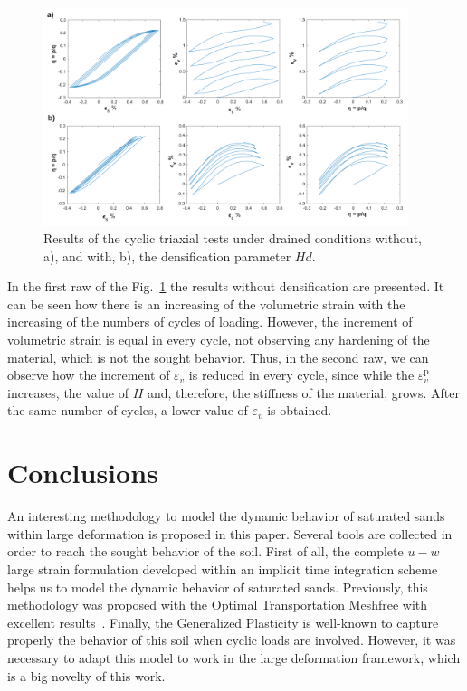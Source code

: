 \documentclass[preprint,12pt,a4paper]{elsarticle}
\begin{document}
\begin{figure}
\centering
\includegraphics[width=0.95\textwidth]{Figs/ciclo_drained.pdf}
\caption{Results of the cyclic triaxial tests under drained conditions without, a), and with, b), the densification parameter $Hd$.}
\label{fig_c_drained}
\end{figure}

In the first raw of the Fig.~\ref{fig_c_drained} the results without densification are presented. It can be seen how there is an increasing of the volumetric strain with the increasing of the numbers of cycles of loading. However, the increment of volumetric strain is equal in every cycle, not observing any hardening of the material, which is not the sought behavior. Thus, in the second raw, we can observe how the increment of $\varepsilon_{v}$ is reduced in every cycle, since while the $\varepsilon_{v}^{\mathrm{p}}$ increases, the value of $H$ and, therefore, the stiffness of the material, grows. After the same number of cycles, a lower value of $\varepsilon_{v}$ is obtained.


\section{Conclusions}
\label{sec:5}

An interesting methodology to model the dynamic behavior of saturated sands within large deformation is proposed in this paper. Several tools are collected in order to reach the sought behavior of the soil. First of all, the complete $u-w$ large strain formulation developed within an implicit time integration scheme helps us to model the dynamic behavior of saturated sands. Previously, this methodology was proposed with the Optimal Transportation Meshfree with excellent results~\cite{Navas:17c}. Finally, the Generalized Plasticity is well-known to capture properly the behavior of this soil when cyclic loads are involved. However, it was necessary to adapt this model to work in the large deformation framework, which is a big novelty of this work.
\end{document}
